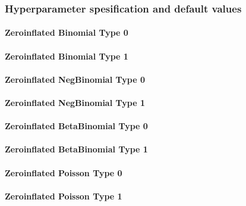 \documentclass[a4paper,11pt]{article}
\begin{document}
\subsubsection*{Hyperparameter spesification and default values}
\paragraph{Zeroinflated Binomial Type 0}


\paragraph{Zeroinflated Binomial Type 1}


\paragraph{Zeroinflated NegBinomial Type 0}


\paragraph{Zeroinflated NegBinomial Type 1}


\paragraph{Zeroinflated BetaBinomial Type 0}


\paragraph{Zeroinflated BetaBinomial Type 1}


\paragraph{Zeroinflated Poisson Type 0}


\paragraph{Zeroinflated Poisson Type 1}

\end{document}
